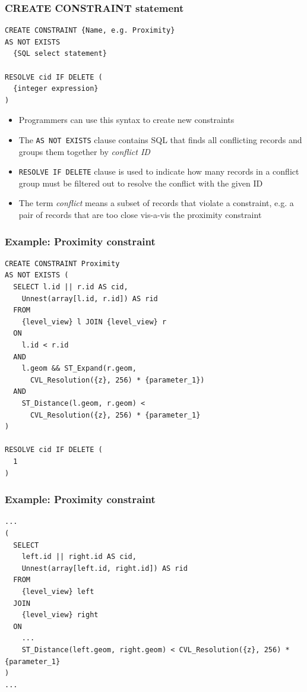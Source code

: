 \documentclass{beamer}
\begin{document}
\begin{frame}[fragile]
\frametitle{CREATE CONSTRAINT statement}
\begin{lstlisting}
CREATE CONSTRAINT {Name, e.g. Proximity}
AS NOT EXISTS
  {SQL select statement}
  
RESOLVE cid IF DELETE (
  {integer expression}
)
\end{lstlisting}

\begin{itemize}
\item Programmers can use this syntax to create new constraints
\item The \texttt{AS NOT EXISTS} clause contains SQL that finds all conflicting records and groups them together by \emph{conflict ID}
\item \texttt{RESOLVE IF DELETE} clause is used to indicate how many records in a conflict group must be filtered out to resolve the conflict with the given ID
\item The term \emph{conflict} means a subset of records that violate a constraint, e.g. a pair of records that are too close vis-a-vis the proximity constraint
\end{itemize}
\end{frame}

\begin{frame}[fragile]
\frametitle{Example: Proximity constraint}
\begin{lstlisting}
CREATE CONSTRAINT Proximity
AS NOT EXISTS (
  SELECT l.id || r.id AS cid, 
    Unnest(array[l.id, r.id]) AS rid
  FROM
    {level_view} l JOIN {level_view} r
  ON
    l.id < r.id
  AND
    l.geom && ST_Expand(r.geom, 
      CVL_Resolution({z}, 256) * {parameter_1})
  AND
    ST_Distance(l.geom, r.geom) < 
      CVL_Resolution({z}, 256) * {parameter_1}
)

RESOLVE cid IF DELETE (
  1
)
\end{lstlisting}
\end{frame}

\begin{frame}[fragile]
\frametitle{Example: Proximity constraint}
\begin{center}
\end{center}
\begin{lstlisting}
...
(
  SELECT
    left.id || right.id AS cid, 
    Unnest(array[left.id, right.id]) AS rid
  FROM 
    {level_view} left
  JOIN 
    {level_view} right
  ON 
    ...
    ST_Distance(left.geom, right.geom) < CVL_Resolution({z}, 256) * {parameter_1}
)
...
\end{lstlisting}
\end{frame}
\end{document}
